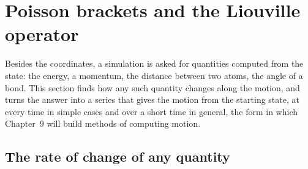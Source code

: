\section{Poisson brackets and the Liouville operator}
\label{sec:ha-brackets}

Besides the coordinates, a simulation is asked for quantities computed
from the state: the energy, a momentum, the distance between two atoms,
the angle of a bond. This section finds how any such quantity changes
along the motion, and turns the answer into a series that gives the
motion from the starting state, at every time in simple cases and over a
short time in general, the form in which
Chapter~9 will build methods of computing motion.

\subsection*{The rate of change of any quantity}

